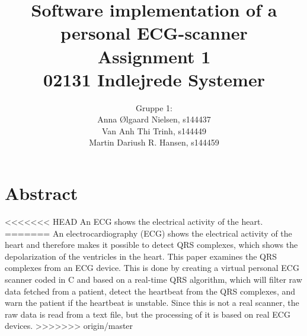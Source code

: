 \documentclass{article}
\title{\huge Software implementation of a personal ECG-scanner \\ \LARGE Assignment 1 \\ \LARGE 02131 Indlejrede Systemer}
\author{Gruppe 1: \\Anna Ølgaard Nielsen, s144437 \\ Van Anh Thi Trinh, s144449 \\ Martin Dariush R. Hansen, s144459}
\date{\myfont \displaydate{date}}
\begin{document}
\maketitle

\newpage

\section*{Abstract}
<<<<<<< HEAD
An ECG shows the electrical activity of the heart. 
=======
An electrocardiography (ECG) shows the electrical activity of the heart and therefore makes it possible to detect QRS complexes, which shows the depolarization of the ventricles in the heart\cite{3}. This paper examines the QRS complexes from an ECG device. This is done by creating a virtual personal ECG scanner coded in C and based on a real-time QRS algorithm, which will filter raw data fetched from a patient, detect the heartbeat from the QRS complexes\cite{1}, and warn the patient if the heartbeat is unstable. Since this is not a real scanner, the raw data is read from a text file, but the processing of it is based on real ECG devices.
>>>>>>> origin/master

\tableofcontents

\newpage
\end{document}
